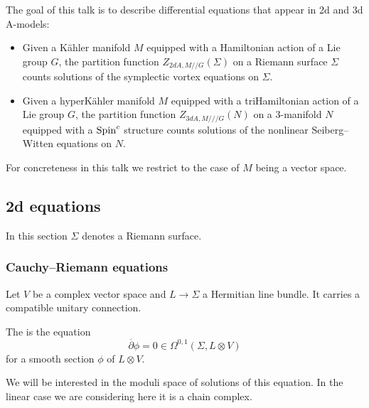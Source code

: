 

The goal of this talk is to describe differential equations that appear in 2d and 3d A-models:
\begin{itemize}
\item Given a K\"ahler manifold $M$ equipped with a Hamiltonian action of a Lie group $G$, the partition function $Z_{2dA, M/\!/G}(\Sigma)$ on a Riemann surface $\Sigma$ counts solutions of the symplectic vortex equations on $\Sigma$.

\item Given a hyperK\"ahler manifold $M$ equipped with a triHamiltonian action of a Lie group $G$, the partition function $Z_{3dA, M/\!/\!/G}(N)$ on a 3-manifold $N$ equipped with a $\mathrm{Spin}^c$ structure counts solutions of the nonlinear Seiberg--Witten equations on $N$.
\end{itemize}

For concreteness in this talk we restrict to the case of $M$ being a vector space.

\subsection{2d equations}

In this section $\Sigma$ denotes a Riemann surface.

\subsubsection{Cauchy--Riemann equations}

Let $V$ be a complex vector space and $L\rightarrow \Sigma$ a Hermitian line bundle. It carries a compatible unitary connection.

\begin{defn}
The  is the equation
\[\overline{\partial} \phi = 0\in\Omega^{0, 1}(\Sigma, L\otimes V)\]
for a smooth section $\phi$ of $L\otimes V$.
\end{defn}

We will be interested in the moduli space of solutions of this equation. In the linear case we are considering here it is a chain complex.

